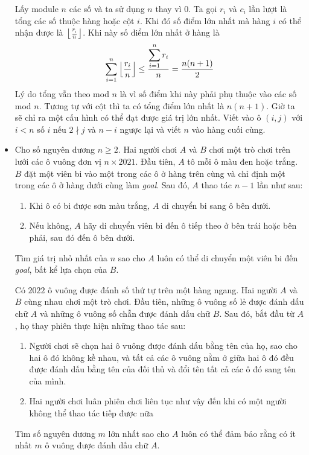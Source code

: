 \documentclass[11pt]{scrartcl}
\begin{document}
\begin{itemize}[label=, leftmargin=0em, itemsep=0.5em]
    \begin{sol}
        Lấy module $n$ các số và ta sử dụng $n$ thay vì $0$. 
        Ta gọi $r_i$ và $c_i$ lần lượt là tổng các số thuộc hàng hoặc cột $i$. Khi đó số điểm lớn nhất mà hàng $i$ có thể nhận được là $\left\lfloor \frac{r_i}{n} \right\rfloor$. Khi này số điểm lớn nhất ở hàng là 
        \[
            \sum_{i = 1}^n \left\lfloor \frac{r_i}{n} \right\rfloor \leq \frac{\dsum_{i = 1}^n r_i}{n} = \frac{n(n + 1)}{2}
        \]
        Lý do tổng vẫn theo mod $n$ là vì số điểm khi này phải phụ thuộc vào các số mod $n$. Tương tự với cột thì ta có tổng điểm lớn nhất là $n(n +1)$. Giờ ta sẽ chỉ ra một cấu hình có thể đạt được giá trị lớn nhất. Viết vào ô $(i,j)$ với $i<n$ số $i$ nếu $2\nmid j$ và $n-i$ ngược lại và viết $n$ vào hàng cuối cùng.
    \end{sol}

    \item \begin{btvn}
        Cho số nguyên dương $n \geq 2$. Hai người chơi $A$ và $B$ chơi một trò chơi trên lưới các ô vuông đơn vị $n \times 2021$. Đầu tiên, $A$ tô mỗi ô màu đen hoặc trắng. $B$ đặt một viên bi vào một trong các ô ở hàng trên cùng và chỉ định một trong các ô ở hàng dưới cùng làm \textit{goal}. Sau đó, $A$ thao tác $n - 1$ lần như sau:
        \begin{enumerate}
            \item Khi ô có bi được sơn màu trắng, $A$ di chuyển bi sang ô bên dưới.
            \item Nếu không, $A$ hãy di chuyển viên bi đến ô tiếp theo ở bên trái hoặc bên phải, sau đó đến ô bên dưới.
            
        \end{enumerate}
        
        Tìm giá trị nhỏ nhất của $n$ sao cho $A$ luôn có thể di chuyển một viên bi đến \textit{goal}, bất kể lựa chọn của $B$.
    \end{btvn}

    \begin{bt}
        Có $2022$ ô vuông được đánh số thứ tự trên một hàng ngang. Hai người $A$ và $B$ cùng nhau chơi một trò chơi. Đầu tiên, những ô vuông số lẻ được đánh dấu chữ $A$ và những ô vuông số chẵn được đánh dấu chữ $B$. Sau đó, bắt đầu từ $A$, họ thay phiên thực hiện những thao tác sau:
        \begin{enumerate}
            \item Người chơi sẽ chọn hai ô vuông được đánh dấu bằng tên của họ, sao cho hai ô đó không kề nhau, và tất cả các ô vuông nằm ở giữa hai ô đó đều được đánh dấu bằng tên của đối thủ và đổi tên tất cả các ô đó sang tên của mình.
            \item Hai người chơi luân phiên chơi liên tục như vậy đến khi có một người không thể thao tác tiếp được nữa
        \end{enumerate}
        Tìm số nguyên dương $m$ lớn nhất sao cho $A$ luôn có thể đảm bảo rằng có ít nhất $m$ ô vuông được đánh dấu chữ $A$.
    \end{bt}


\end{itemize}
\end{document}
